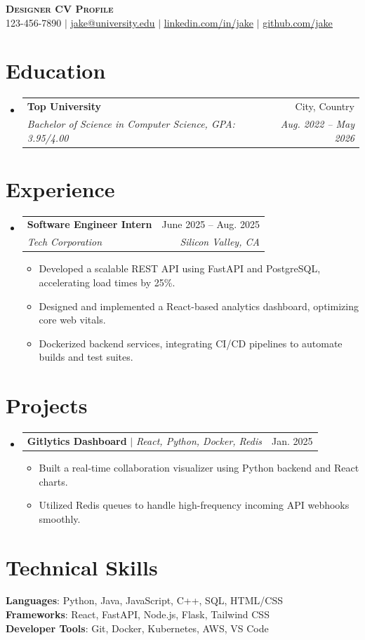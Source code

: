 \documentclass[letterpaper,11pt]{article}
\makeatletter
\newcommand{\resumeItem}[1]{
  \item\small{
    {#1 \vspace{-2pt}}
  }
}
\newcommand{\resumeSubheading}[4]{
  \vspace{-2pt}\item
    \begin{tabular*}{0.97\textwidth}[t]{l@{\extracolsep{\fill}}r}
      \textbf{#1} & #2 \\
      \textit{\small#3} & \textit{\small #4} \\
    \end{tabular*}\vspace{-7pt}
}
\newcommand{\resumeProjectHeading}[2]{
    \item
    \begin{tabular*}{0.97\textwidth}{l@{\extracolsep{\fill}}r}
      \small#1 & #2 \\
    \end{tabular*}\vspace{-7pt}
}
\newcommand{\resumeSubHeadingListStart}{\begin{itemize}[leftmargin=0.15in, label={}]}
\newcommand{\resumeSubHeadingListEnd}{\end{itemize}}
\newcommand{\resumeItemListStart}{\begin{itemize}}
\newcommand{\resumeItemListEnd}{\end{itemize}\vspace{-5pt}}
\makeatother
\begin{document}
\begin{center}
    \textbf{\Huge \scshape Designer CV Profile} \\ \vspace{1pt}
    \small 123-456-7890 $|$ \href{mailto:jake@university.edu}{\underline{jake@university.edu}} $|$ 
    \href{https://linkedin.com}{\underline{linkedin.com/in/jake}} $|$
    \href{https://github.com}{\underline{github.com/jake}}
\end{center}

\section{Education}
  \resumeSubHeadingListStart
    \resumeSubheading
      {Top University}{City, Country}
      {Bachelor of Science in Computer Science, GPA: 3.95/4.00}{Aug. 2022 -- May 2026}
  \resumeSubHeadingListEnd

\section{Experience}
  \resumeSubHeadingListStart
    \resumeSubheading
      {Software Engineer Intern}{June 2025 -- Aug. 2025}
      {Tech Corporation}{Silicon Valley, CA}
      \resumeItemListStart
        \resumeItem{Developed a scalable REST API using FastAPI and PostgreSQL, accelerating load times by 25\%.}
        \resumeItem{Designed and implemented a React-based analytics dashboard, optimizing core web vitals.}
        \resumeItem{Dockerized backend services, integrating CI/CD pipelines to automate builds and test suites.}
      \resumeItemListEnd
  \resumeSubHeadingListEnd

\section{Projects}
  \resumeSubHeadingListStart
    \resumeProjectHeading
      {\textbf{Gitlytics Dashboard} $|$ \emph{React, Python, Docker, Redis}}{Jan. 2025}
      \resumeItemListStart
        \resumeItem{Built a real-time collaboration visualizer using Python backend and React charts.}
        \resumeItem{Utilized Redis queues to handle high-frequency incoming API webhooks smoothly.}
      \resumeItemListEnd
  \resumeSubHeadingListEnd

\section{Technical Skills}
 \begin{itemize}[leftmargin=0.15in, label={}]
    \small{\item{
     \textbf{Languages}{: Python, Java, JavaScript, C++, SQL, HTML/CSS} \\
     \textbf{Frameworks}{: React, FastAPI, Node.js, Flask, Tailwind CSS} \\
     \textbf{Developer Tools}{: Git, Docker, Kubernetes, AWS, VS Code}
    }}
 \end{itemize}
\end{document}
